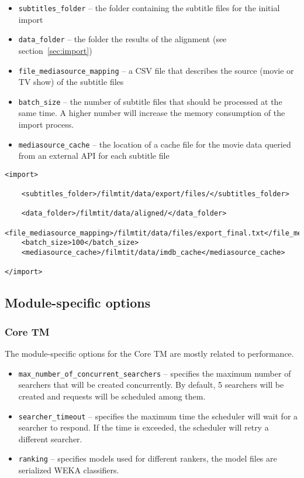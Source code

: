 \begin{itemize}
        \item \verb#subtitles_folder# -- the folder containing the subtitle files for the initial import
        \item \verb#data_folder# -- the folder the results of the alignment (see section~\ref{sec:import})
        \item \verb#file_mediasource_mapping# -- a CSV file that describes the source (movie or TV show) of the  subtitle files
        \item \verb#batch_size# -- the number of subtitle files that should be processed at the same time. A higher number will increase the memory consumption of the import process.
        \item \verb#mediasource_cache# -- the location of a cache file for the movie data queried from an external API for each subtitle file
        
\end{itemize}


\begin{lstlisting}
<import>

    <subtitles_folder>/filmtit/data/export/files/</subtitles_folder>

    <data_folder>/filmtit/data/aligned/</data_folder>
    <file_mediasource_mapping>/filmtit/data/files/export_final.txt</file_mediasource_mapping>
    <batch_size>100</batch_size>
    <mediasource_cache>/filmtit/data/imdb_cache</mediasource_cache>

</import>
\end{lstlisting}


\subsection{Module-specific options}

\subsubsection{Core TM}

The module-specific options for the Core TM are mostly related to performance.

\begin{itemize}
        \item \verb#max_number_of_concurrent_searchers# -- specifies the maximum number of searchers that will be created concurrently. By default, 5 searchers will be created and requests will be scheduled among them.
        \item \verb#searcher_timeout# -- specifies the maximum time the scheduler will wait for a searcher to respond. If the time is exceeded, the scheduler will retry a different searcher.
        \item \verb#ranking# -- specifies models used for different rankers, the model files are serialized WEKA classifiers.

\end{itemize}

